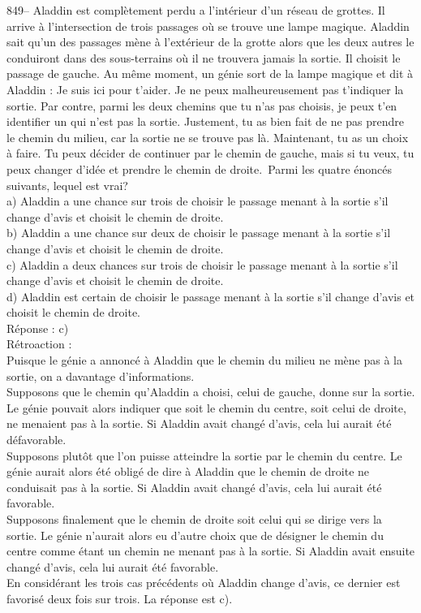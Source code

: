 ﻿\documentclass[letterpaper, 12pt]{article}
\begin{document}
849-- Aladdin est compl\`etement perdu a l'int\'erieur d'un r\'eseau
de grottes.  Il arrive \`a l'intersection de trois passages o\`u se
trouve une lampe magique.  Aladdin sait qu'un des passages m\`ene
\`a l'ext\'erieur de la grotte alors que les deux autres le
conduiront dans des sous-terrains o\`u il ne trouvera jamais la
sortie.  Il choisit le passage de gauche.  Au m\^eme moment, un
g\'enie sort de la lampe magique et dit \`a Aladdin : \og Je suis
ici pour t'aider.  Je ne peux malheureusement pas t'indiquer la
sortie.  Par contre, parmi les deux chemins que tu n'as pas choisis,
je peux t'en identifier un qui n'est pas la sortie.  Justement, tu
as bien fait de ne pas prendre le chemin du milieu, car la sortie ne
se trouve pas l\`a. Maintenant, tu as un choix \`a faire.  Tu peux
d\'ecider de continuer par le chemin de gauche, mais si tu veux, tu
peux changer d'id\'ee et prendre le chemin de droite.\fg\  Parmi les
quatre \'enonc\'es suivants, lequel est
vrai?\\
a) Aladdin a une chance sur trois de choisir le passage menant \`a la sortie
s'il change d'avis et choisit le chemin de droite. \\
b) Aladdin a une chance sur deux de choisir le passage menant \`a la sortie
s'il change d'avis et choisit le chemin de droite.\\
c) Aladdin a deux chances sur trois de choisir le passage menant \`a la
sortie s'il change d'avis et choisit le chemin de droite.\\
d) Aladdin est certain de choisir le passage menant \`a la sortie s'il
change d'avis et choisit le chemin de droite.\\

R\'eponse : c)\\

R\'etroaction : \\
Puisque le g\'enie a annonc\'e \`a Aladdin que le chemin du milieu ne m\`ene
pas \`a la sortie, on a davantage d'informations.\\
Supposons que le chemin qu'Aladdin a choisi, celui de gauche, donne
sur la sortie. Le g\'enie pouvait alors indiquer que soit le chemin
du centre, soit celui de droite, ne menaient pas \`a la sortie. Si
Aladdin avait chang\'e d'avis, cela lui aurait \'et\'e
d\'efavorable.\\
Supposons plut\^ot que l'on puisse atteindre la sortie par le chemin du
centre. Le g\'enie aurait alors \'et\'e oblig\'e de dire \`a Aladdin que le
chemin de droite ne conduisait pas \`a la sortie. Si Aladdin avait chang\'e
d'avis, cela lui aurait \'et\'e favorable.\\
Supposons finalement que le chemin de droite soit celui qui se dirige vers
la sortie. Le g\'enie n'aurait alors eu d'autre choix que de d\'esigner le
chemin du centre comme \'etant un chemin ne menant pas \`a la sortie. Si
Aladdin avait ensuite chang\'e d'avis, cela lui aurait \'et\'e favorable.\\
En consid\'erant les trois cas pr\'ec\'edents o\`u Aladdin change d'avis, ce
dernier est favoris\'e deux fois sur trois. La r\'eponse est c).\\
\end{document}
